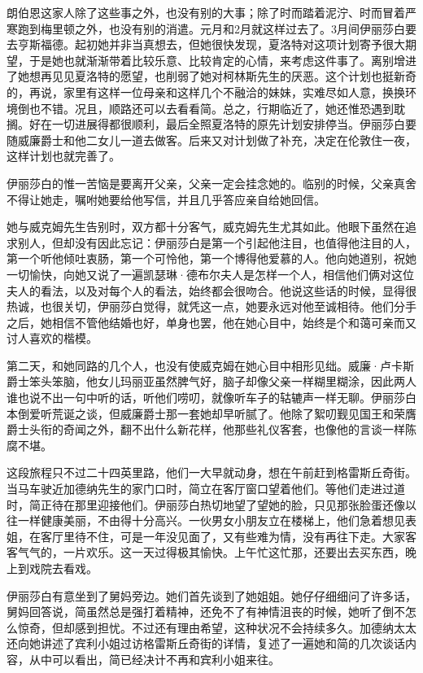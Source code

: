 \par 朗伯恩这家人除了这些事之外，也没有别的大事；除了时而踏着泥泞、时而冒着严寒跑到梅里顿之外，也没有别的消遣。元月和2月就这样过去了。3月间伊丽莎白要去亨斯福德。起初她并非当真想去，但她很快发现，夏洛特对这项计划寄予很大期望，于是她也就渐渐带着比较乐意、比较肯定的心情，来考虑这件事了。离别增进了她想再见见夏洛特的愿望，也削弱了她对柯林斯先生的厌恶。这个计划也挺新奇的，再说，家里有这样一位母亲和这样几个不融洽的妹妹，实难尽如人意，换换环境倒也不错。况且，顺路还可以去看看简。总之，行期临近了，她还惟恐遇到耽搁。好在一切进展得都很顺利，最后全照夏洛特的原先计划安排停当。伊丽莎白要随威廉爵士和他二女儿一道去做客。后来又对计划做了补充，决定在伦敦住一夜，这样计划也就完善了。
\par 伊丽莎白的惟一苦恼是要离开父亲，父亲一定会挂念她的。临别的时候，父亲真舍不得让她走，嘱咐她要给他写信，并且几乎答应亲自给她回信。
\par 她与威克姆先生告别时，双方都十分客气，威克姆先生尤其如此。他眼下虽然在追求别人，但却没有因此忘记：伊丽莎白是第一个引起他注目，也值得他注目的人，第一个听他倾吐衷肠，第一个可怜他，第一个博得他爱慕的人。他向她道别，祝她一切愉快，向她又说了一遍凯瑟琳·德布尔夫人是怎样一个人，相信他们俩对这位夫人的看法，以及对每个人的看法，始终都会很吻合。他说这些话的时候，显得很热诚，也很关切，伊丽莎白觉得，就凭这一点，她要永远对他至诚相待。他们分手之后，她相信不管他结婚也好，单身也罢，他在她心目中，始终是个和蔼可亲而又讨人喜欢的楷模。
\par 第二天，和她同路的几个人，也没有使威克姆在她心目中相形见绌。威廉·卢卡斯爵士笨头笨脑，他女儿玛丽亚虽然脾气好，脑子却像父亲一样糊里糊涂，因此两人谁也说不出一句中听的话，听他们唠叨，就像听车子的轱辘声一样无聊。伊丽莎白本倒爱听荒诞之谈，但威廉爵士那一套她却早听腻了。他除了絮叨觐见国王和荣膺爵士头衔的奇闻之外，翻不出什么新花样，他那些礼仪客套，也像他的言谈一样陈腐不堪。
\par 这段旅程只不过二十四英里路，他们一大早就动身，想在午前赶到格雷斯丘奇街。当马车驶近加德纳先生的家门口时，简立在客厅窗口望着他们。等他们走进过道时，简正待在那里迎接他们。伊丽莎白热切地望了望她的脸，只见那张脸蛋还像以往一样健康美丽，不由得十分高兴。一伙男女小朋友立在楼梯上，他们急着想见表姐，在客厅里待不住，可是一年没见面了，又有些难为情，没有再往下走。大家客客气气的，一片欢乐。这一天过得极其愉快。上午忙这忙那，还要出去买东西，晚上到戏院去看戏。
\par 伊丽莎白有意坐到了舅妈旁边。她们首先谈到了她姐姐。她仔仔细细问了许多话，舅妈回答说，简虽然总是强打着精神，还免不了有神情沮丧的时候，她听了倒不怎么惊奇，但却感到担忧。不过还有理由希望，这种状况不会持续多久。加德纳太太还向她讲述了宾利小姐过访格雷斯丘奇街的详情，复述了一遍她和简的几次谈话内容，从中可以看出，简已经决计不再和宾利小姐来往。
